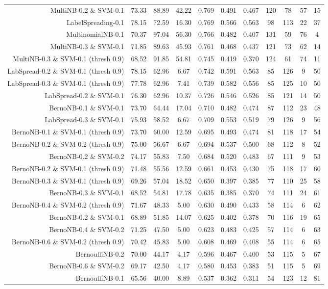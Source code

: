 \begin{table}[!htb]
\begin{tabular}{r|c|c|c|c|c|c|c|c|c|c}
MultiNB-0.2 \& SVM-0.1 & 73.33 & 88.89 & 42.22 & 0.769 & 0.491 & 0.467 & 120 & 78 & 57 & 15 \\ 
LabelSpreading-0.1 & 78.15 & 72.59 & 16.30 & 0.769 & 0.566 & 0.563 & 98 & 113 & 22 & 37 \\ 
MultinomialNB-0.1 & 70.37 & 97.04 & 56.30 & 0.766 & 0.482 & 0.407 & 131 & 59 & 76 & 4 \\ 
MultiNB-0.3 \& SVM-0.1 & 71.85 & 89.63 & 45.93 & 0.761 & 0.468 & 0.437 & 121 & 73 & 62 & 14 \\ 
MultiNB-0.3 \& SVM-0.1 (thresh 0.9) & 68.52 & 91.85 & 54.81 & 0.745 & 0.419 & 0.370 & 124 & 61 & 74 & 11 \\ 
LabSpread-0.2 \& SVM-0.1 (thresh 0.9) & 78.15 & 62.96 & 6.67 & 0.742 & 0.591 & 0.563 & 85 & 126 & 9 & 50 \\ 
LabSpread-0.3 \& SVM-0.1 (thresh 0.9) & 77.78 & 62.96 & 7.41 & 0.739 & 0.582 & 0.556 & 85 & 125 & 10 & 50 \\ 
LabSpread-0.2 \& SVM-0.1 & 76.30 & 62.96 & 10.37 & 0.726 & 0.546 & 0.526 & 85 & 121 & 14 & 50 \\ 
BernoNB-0.1 \& SVM-0.1 & 73.70 & 64.44 & 17.04 & 0.710 & 0.482 & 0.474 & 87 & 112 & 23 & 48 \\ 
LabSpread-0.3 \& SVM-0.1 & 75.93 & 58.52 & 6.67 & 0.709 & 0.553 & 0.519 & 79 & 126 & 9 & 56 \\ 
BernoNB-0.1 \& SVM-0.1 (thresh 0.9) & 73.70 & 60.00 & 12.59 & 0.695 & 0.493 & 0.474 & 81 & 118 & 17 & 54 \\ 
BernoNB-0.2 \& SVM-0.2 (thresh 0.9) & 75.00 & 56.67 & 6.67 & 0.694 & 0.537 & 0.500 & 68 & 112 & 8 & 52 \\ 
BernoNB-0.2 \& SVM-0.2 & 74.17 & 55.83 & 7.50 & 0.684 & 0.520 & 0.483 & 67 & 111 & 9 & 53 \\ 
BernoNB-0.2 \& SVM-0.1 (thresh 0.9) & 71.48 & 55.56 & 12.59 & 0.661 & 0.453 & 0.430 & 75 & 118 & 17 & 60 \\ 
BernoNB-0.3 \& SVM-0.1 (thresh 0.9) & 69.26 & 57.04 & 18.52 & 0.650 & 0.397 & 0.385 & 77 & 110 & 25 & 58 \\ 
BernoNB-0.3 \& SVM-0.1 & 68.52 & 54.81 & 17.78 & 0.635 & 0.385 & 0.370 & 74 & 111 & 24 & 61 \\ 
BernoNB-0.4 \& SVM-0.2 (thresh 0.9) & 71.67 & 48.33 & 5.00 & 0.630 & 0.490 & 0.433 & 58 & 114 & 6 & 62 \\ 
BernoNB-0.2 \& SVM-0.1 & 68.89 & 51.85 & 14.07 & 0.625 & 0.402 & 0.378 & 70 & 116 & 19 & 65 \\ 
BernoNB-0.4 \& SVM-0.2 & 71.25 & 47.50 & 5.00 & 0.623 & 0.483 & 0.425 & 57 & 114 & 6 & 63 \\ 
BernoNB-0.6 \& SVM-0.2 (thresh 0.9) & 70.42 & 45.83 & 5.00 & 0.608 & 0.469 & 0.408 & 55 & 114 & 6 & 65 \\ 
BernoulliNB-0.2 & 70.00 & 44.17 & 4.17 & 0.596 & 0.467 & 0.400 & 53 & 115 & 5 & 67 \\ 
BernoNB-0.6 \& SVM-0.2 & 69.17 & 42.50 & 4.17 & 0.580 & 0.453 & 0.383 & 51 & 115 & 5 & 69 \\ 
BernoulliNB-0.1 & 65.56 & 40.00 & 8.89 & 0.537 & 0.362 & 0.311 & 54 & 123 & 12 & 81 \\ 
\hline\hline
\end{tabular}
\end{table}
